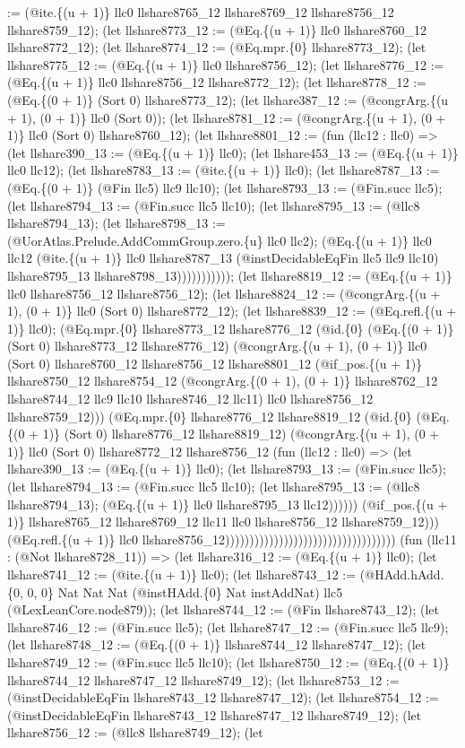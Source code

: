 \documentclass[11pt]{article}
\begin{document}
:= (@ite.\{(u + 1)\} llc0 llshare8765\_12 llshare8769\_12 llshare8756\_12 llshare8759\_12); (let llshare8773\_12 := (@Eq.\{(u + 1)\} llc0 llshare8760\_12 llshare8772\_12); (let llshare8774\_12 := (@Eq.mpr.\{0\} llshare8773\_12); (let llshare8775\_12 := (@Eq.\{(u + 1)\} llc0 llshare8756\_12); (let llshare8776\_12 := (@Eq.\{(u + 1)\} llc0 llshare8756\_12 llshare8772\_12); (let llshare8778\_12 := (@Eq.\{(0 + 1)\} (Sort 0) llshare8773\_12); (let llshare387\_12 := (@congrArg.\{(u + 1), (0 + 1)\} llc0 (Sort 0)); (let llshare8781\_12 := (@congrArg.\{(u + 1), (0 + 1)\} llc0 (Sort 0) llshare8760\_12); (let llshare8801\_12 := (fun (llc12 : llc0) => (let llshare390\_13 := (@Eq.\{(u + 1)\} llc0); (let llshare453\_13 := (@Eq.\{(u + 1)\} llc0 llc12); (let llshare8783\_13 := (@ite.\{(u + 1)\} llc0); (let llshare8787\_13 := (@Eq.\{(0 + 1)\} (@Fin llc5) llc9 llc10); (let llshare8793\_13 := (@Fin.succ llc5); (let llshare8794\_13 := (@Fin.succ llc5 llc10); (let llshare8795\_13 := (@llc8 llshare8794\_13); (let llshare8798\_13 := (@UorAtlas.Prelude.AddCommGroup.zero.\{u\} llc0 llc2); (@Eq.\{(u + 1)\} llc0 llc12 (@ite.\{(u + 1)\} llc0 llshare8787\_13 (@instDecidableEqFin llc5 llc9 llc10) llshare8795\_13 llshare8798\_13))))))))))); (let llshare8819\_12 := (@Eq.\{(u + 1)\} llc0 llshare8756\_12 llshare8756\_12); (let llshare8824\_12 := (@congrArg.\{(u + 1), (0 + 1)\} llc0 (Sort 0) llshare8772\_12); (let llshare8839\_12 := (@Eq.refl.\{(u + 1)\} llc0); (@Eq.mpr.\{0\} llshare8773\_12 llshare8776\_12 (@id.\{0\} (@Eq.\{(0 + 1)\} (Sort 0) llshare8773\_12 llshare8776\_12) (@congrArg.\{(u + 1), (0 + 1)\} llc0 (Sort 0) llshare8760\_12 llshare8756\_12 llshare8801\_12 (@if\_pos.\{(u + 1)\} llshare8750\_12 llshare8754\_12 (@congrArg.\{(0 + 1), (0 + 1)\} llshare8762\_12 llshare8744\_12 llc9 llc10 llshare8746\_12 llc11) llc0 llshare8756\_12 llshare8759\_12))) (@Eq.mpr.\{0\} llshare8776\_12 llshare8819\_12 (@id.\{0\} (@Eq.\{(0 + 1)\} (Sort 0) llshare8776\_12 llshare8819\_12) (@congrArg.\{(u + 1), (0 + 1)\} llc0 (Sort 0) llshare8772\_12 llshare8756\_12 (fun (llc12 : llc0) => (let llshare390\_13 := (@Eq.\{(u + 1)\} llc0); (let llshare8793\_13 := (@Fin.succ llc5); (let llshare8794\_13 := (@Fin.succ llc5 llc10); (let llshare8795\_13 := (@llc8 llshare8794\_13); (@Eq.\{(u + 1)\} llc0 llshare8795\_13 llc12)))))) (@if\_pos.\{(u + 1)\} llshare8765\_12 llshare8769\_12 llc11 llc0 llshare8756\_12 llshare8759\_12))) (@Eq.refl.\{(u + 1)\} llc0 llshare8756\_12))))))))))))))))))))))))))))))))))) (fun (llc11 : (@Not llshare8728\_11)) => (let llshare316\_12 := (@Eq.\{(u + 1)\} llc0); (let llshare8741\_12 := (@ite.\{(u + 1)\} llc0); (let llshare8743\_12 := (@HAdd.hAdd.\{0, 0, 0\} Nat Nat Nat (@instHAdd.\{0\} Nat instAddNat) llc5 (@LexLeanCore.node879)); (let llshare8744\_12 := (@Fin llshare8743\_12); (let llshare8746\_12 := (@Fin.succ llc5); (let llshare8747\_12 := (@Fin.succ llc5 llc9); (let llshare8748\_12 := (@Eq.\{(0 + 1)\} llshare8744\_12 llshare8747\_12); (let llshare8749\_12 := (@Fin.succ llc5 llc10); (let llshare8750\_12 := (@Eq.\{(0 + 1)\} llshare8744\_12 llshare8747\_12 llshare8749\_12); (let llshare8753\_12 := (@instDecidableEqFin llshare8743\_12 llshare8747\_12); (let llshare8754\_12 := (@instDecidableEqFin llshare8743\_12 llshare8747\_12 llshare8749\_12); (let llshare8756\_12 := (@llc8 llshare8749\_12); (let 
\end{document}
